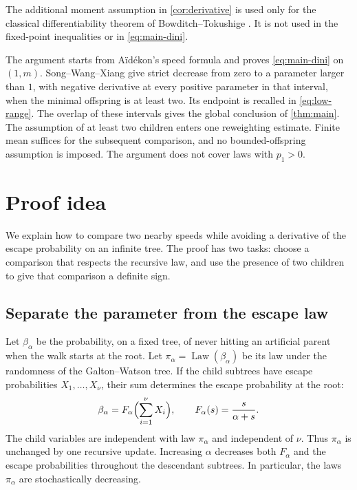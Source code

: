 \documentclass[11pt,a4paper]{article}
\numberwithin{equation}{section}
\theoremstyle{notethm}
\theoremstyle{definition}
\newcommand{\Law}{\operatorname{Law}}
\begin{document}
The additional moment assumption in \cref{cor:derivative} is used only for the
classical differentiability theorem of Bowditch--Tokushige
\cite[Theorem~1.1]{BT}. It is not used in the fixed-point inequalities or in
\eqref{eq:main-dini}.

The argument starts from A\"id\'ekon's speed formula
\cite[Theorem~1.1]{Aidekon} and proves \eqref{eq:main-dini} on $(1,m)$.
Song--Wang--Xiang \cite[Theorem~1.2 and Lemma~2.5]{SWX} give strict
decrease from zero to a parameter larger than $1$, with negative derivative
at every positive parameter in that interval, when the minimal offspring
is at least two. Its endpoint is recalled in \eqref{eq:low-range}. The overlap of
these intervals gives the global conclusion of \cref{thm:main}.
The assumption of at least two children enters one reweighting estimate.
Finite mean suffices for the subsequent comparison, and no bounded-offspring
assumption is imposed. The argument does not cover laws with $p_1>0$.

\section{Proof idea}\label{sec:proof-idea}

We explain how to compare two nearby speeds while avoiding a derivative
of the escape probability on an infinite tree. The proof has two tasks:
choose a comparison that respects the recursive law, and use the presence
of two children to give that comparison a definite sign.

\subsection{Separate the parameter from the escape law}

Let $\beta_\alpha$ be the probability, on a fixed tree, of never hitting
an artificial parent when the walk starts at the root. Let
$\pi_\alpha=\Law(\beta_\alpha)$ be its law under the randomness of the
Galton--Watson tree. If the child subtrees have escape
probabilities $X_1,\ldots,X_\nu$, their sum determines the escape
probability at the root:
\[
 \beta_\alpha=F_\alpha\Bigl(\sum_{i=1}^{\nu}X_i\Bigr),
 \qquad F_\alpha(s)=\frac{s}{\alpha+s}.
\]
The child variables are independent with law $\pi_\alpha$ and independent
of $\nu$. Thus $\pi_\alpha$ is unchanged by one recursive update.
Increasing $\alpha$ decreases both $F_\alpha$ and the escape probabilities
throughout the descendant subtrees. In particular, the laws $\pi_\alpha$
are stochastically decreasing.
\end{document}
